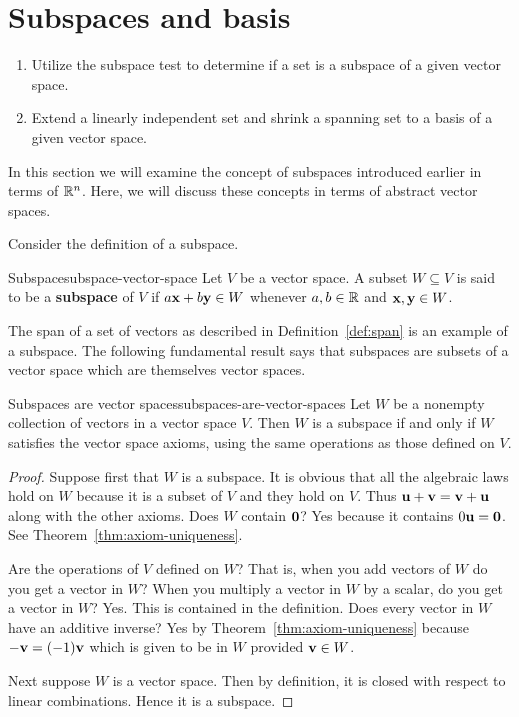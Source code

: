 \section{Subspaces and basis}

\begin{outcome}
  \begin{enumerate}
  \item Utilize the subspace test to determine if a set is a subspace
    of a given vector space.
  \item Extend a linearly independent set and shrink a spanning set to
    a basis of a given vector space.
  \end{enumerate}
\end{outcome}

In this section we will examine the concept of subspaces introduced
earlier in terms of $\mathbb{R}^n$. Here, we will discuss these concepts in
terms of abstract vector spaces.

Consider the definition of a subspace.

\begin{definition}{Subspace}{subspace-vector-space}
  Let $V$ be a vector space. A subset $W\subseteq V$ is said to be a
  \textbf{subspace} of $V$ if
  $a\mbox{\bf x}+b\mbox{\bf y} \in W$ whenever $a,b\in \mathbb{R}$ and
  $\mbox{\bf x},\mbox{\bf y}\in W$.
\end{definition}

The span of a set of vectors as described in Definition~\ref{def:span}
is an example of a subspace. The following fundamental result says
that subspaces are subsets of a vector space which are themselves
vector spaces.

\begin{theorem}{Subspaces are vector spaces}{subspaces-are-vector-spaces}
  Let $W$ be a nonempty collection of vectors in a vector space
  $V$. Then $W$ is a subspace if and only if $W$ satisfies the vector
  space axioms, using the same operations as those defined on $V$.
\end{theorem}

\begin{proof}
  Suppose first that $W$ is a subspace. It is obvious that all the
  algebraic laws hold on $W$ because it is a subset of $V$ and they
  hold on $V$. Thus $\mbox{\bf u}+\mbox{\bf v}=\mbox{\bf v}+\mbox{\bf u}$ along with
  the other axioms. Does $W$ contain $\mbox{\bf 0}$? Yes because it
  contains $0\mbox{\bf u}=\mbox{\bf 0}$. See
  Theorem~\ref{thm:axiom-uniqueness}.

  Are the operations of $V$ defined on $W$? That is, when you add
  vectors of $W$ do you get a vector in $W$? When you multiply a
  vector in $W$ by a scalar, do you get a vector in $W$? Yes. This is
  contained in the definition. Does every vector in $W$ have an
  additive inverse? Yes by Theorem~\ref{thm:axiom-uniqueness} because
  $-\mbox{\bf v}=( -1) \mbox{\bf v}$ which is given to be in $W$ provided
  $\mbox{\bf v}\in W$.

  Next suppose $W$ is a vector space. Then by definition, it is closed
  with respect to linear combinations. Hence it is a subspace.
\end{proof}

